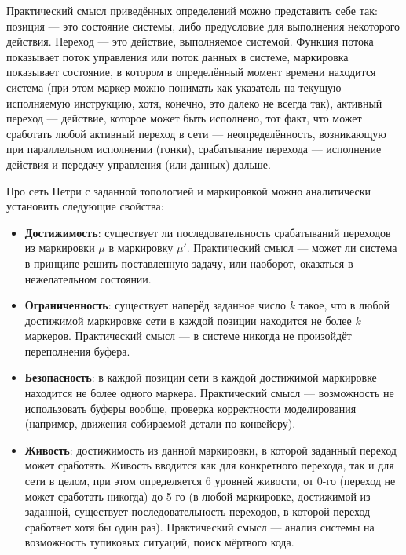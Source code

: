 \documentclass[a4, 14pt]{article}
\begin{document}
Практический смысл приведённых определений можно представить себе так: позиция --- 
это состояние системы, либо предусловие для выполнения некоторого действия. 
Переход --- это действие, выполняемое системой. Функция потока показывает поток 
управления или поток данных в системе, маркировка показывает состояние, в котором 
в определённый момент времени находится система (при этом маркер можно понимать 
как указатель на текущую исполняемую инструкцию, хотя, конечно, это далеко не 
всегда так), активный переход --- действие, которое может быть исполнено, тот 
факт, что может сработать любой активный переход в сети --- неопределённость, 
возникающую при параллельном исполнении (гонки), срабатывание перехода --- 
исполнение действия и передачу управления (или данных) дальше.

Про сеть Петри с заданной топологией и маркировкой можно аналитически установить 
следующие свойства:
\begin{itemize}
  \item \textbf{Достижимость}: существует ли последовательность срабатываний переходов из 
    маркировки $\mu$ в маркировку $\mu'$. Практический смысл --- может ли система 
    в принципе решить поставленную задачу, или наоборот, оказаться в нежелательном 
    состоянии.
  \item \textbf{Ограниченность}: существует наперёд заданное число $k$ такое, что в любой 
    достижимой маркировке сети в каждой позиции находится не более $k$ маркеров. 
    Практический смысл --- в системе никогда не произойдёт переполнения буфера.
  \item \textbf{Безопасность}: в каждой позиции сети в каждой достижимой маркировке 
    находится не более одного маркера. Практический смысл --- возможность не 
    использовать буферы вообще, проверка корректности моделирования (например, 
    движения собираемой детали по конвейеру).
  \item \textbf{Живость}: достижимость из данной маркировки, в которой заданный 
    переход может сработать. Живость вводится как для конкретного перехода, так 
    и для сети в целом, при этом определяется 6 уровней живости, от 0-го (переход 
    не может сработать никогда) до 5-го (в любой маркировке, достижимой из 
    заданной, существует последовательность переходов, в которой переход сработает 
    хотя бы один раз). Практический смысл --- анализ системы на возможность 
    тупиковых ситуаций, поиск мёртвого кода.
\end{itemize}
\end{document}
